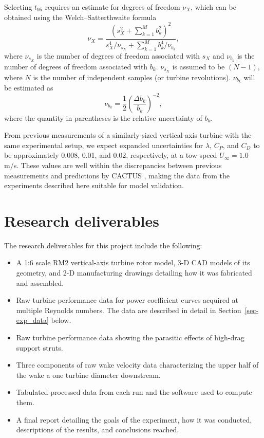 \documentclass[12pt,letterpaper]{scrreprt}
\begin{document}
Selecting $t_{95}$ requires an estimate for degrees of freedom $\nu_X$, which can
be obtained using the Welch--Satterthwaite formula
\begin{equation}
\nu_X = \frac{\left(s_X^2 + \sum_{k=1}^M b_k^2 \right)^2}
             {s_X^4/\nu_{s_X} + \sum_{k=1}^M b_k^4/\nu_{b_k}},
\end{equation}
where $\nu_{s_X}$ is the number of degrees of freedom associated with $s_X$ and
$\nu_{b_k}$ is the number of degrees of freedom associated with $b_k$.
$\nu_{s_X}$ is assumed to be $(N-1)$, where $N$ is the number of independent
samples (or turbine revolutions). $\nu_{b_k}$ will be estimated as
\begin{equation}
\nu_{b_k} = \frac{1}{2} \left( \frac{\Delta b_k}{b_k} \right)^{-2},
\end{equation}
where the quantity in parentheses is the relative uncertainty of $b_k$.

From previous measurements of a similarly-sized vertical-axis turbine with the
same experimental setup, we expect expanded uncertainties for $\lambda$, $C_P$,
and $C_D$ to be approximately 0.008, 0.01, and 0.02, respectively, at a tow
speed $U_\infty = 1.0$ m/s. These values are well within the discrepancies
between previous measurements and predictions by CACTUS \cite{Michelen2014},
making the data from the experiments described here suitable for model validation.

\chapter{Research deliverables}

The research deliverables for this project include the following:

\begin{itemize}

    \item A 1:6 scale RM2 vertical-axis turbine rotor model, 3-D CAD models of
    its geometry, and 2-D manufacturing drawings detailing how it was fabricated
    and assembled.
    
    \item Raw turbine performance data for power coefficient curves acquired at
    multiple Reynolds numbers. The data are described in detail in
    Section~\ref{sec-exp_data} below.
    
    \item Raw turbine performance data showing the parasitic effects of
    high-drag support struts.
    
    \item Three components of raw wake velocity data characterizing the upper
    half of the wake a one turbine diameter downstream.
    
    \item Tabulated processed data from each run and the software used to
    compute them.
    
    \item A final report detailing the goals of the experiment, how it was
    conducted, descriptions of the results, and conclusions reached.

\end{itemize}
\end{document}

